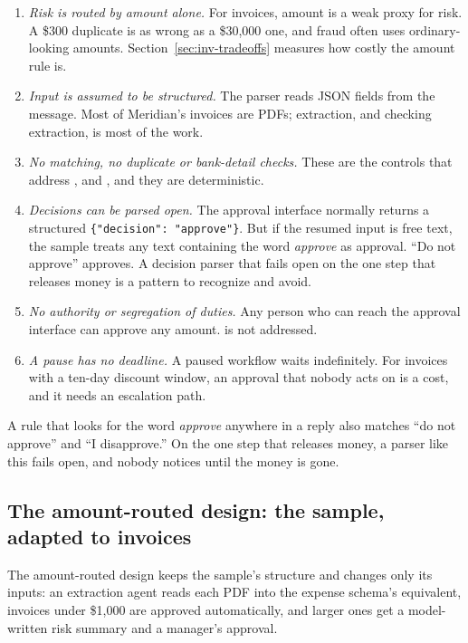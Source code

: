 \begin{enumerate}[itemsep=2pt]
  \item \emph{Risk is routed by amount alone.} For invoices, amount is a weak proxy for risk. A \$300 duplicate is as wrong as a \$30{,}000 one, and fraud often uses ordinary-looking amounts. Section~\ref{sec:inv-tradeoffs} measures how costly the amount rule is.
  \item \emph{Input is assumed to be structured.} The parser reads JSON fields from the message. Most of Meridian's invoices are PDFs; extraction, and checking extraction, is most of the work.
  \item \emph{No matching, no duplicate or bank-detail checks.} These are the controls that address ,  and , and they are deterministic.
  \item \emph{Decisions can be parsed open.} The approval interface normally returns a structured \texttt{\{"decision": "approve"\}}. But if the resumed input is free text, the sample treats any text containing the word \emph{approve} as approval. ``Do not approve'' approves. A decision parser that fails open on the one step that releases money is a pattern to recognize and avoid.
  \item \emph{No authority or segregation of duties.} Any person who can reach the approval interface can approve any amount.  is not addressed.
  \item \emph{A pause has no deadline.} A paused workflow waits indefinitely. For invoices with a ten-day discount window, an approval that nobody acts on is a cost, and it needs an escalation path.
\end{enumerate}

\begin{watchout}
A rule that looks for the word \emph{approve} anywhere in a reply also matches ``do not approve'' and ``I disapprove.'' On the one step that releases money, a parser like this fails open, and nobody notices until the money is gone.
\end{watchout}

\subsection{The amount-routed design: the sample, adapted to invoices}

The amount-routed design keeps the sample's structure and changes only its inputs: an extraction agent reads each PDF into the expense schema's equivalent, invoices under \$1{,}000 are approved automatically, and larger ones get a model-written risk summary and a manager's approval.


